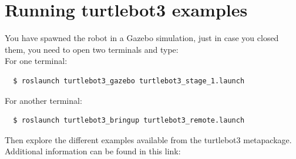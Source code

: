 \documentclass[12pt]{article}
\begin{document}
\section{Running turtlebot3 examples}
You have spawned the robot in a Gazebo simulation, just in case you closed them, you need to open two terminals and type:\\

For one terminal:
\begin{verbatim}
  $ roslaunch turtlebot3_gazebo turtlebot3_stage_1.launch
\end{verbatim}

For another terminal:

\begin{verbatim}
  $ roslaunch turtlebot3_bringup turtlebot3_remote.launch
\end{verbatim}

Then explore the different examples available from the turtlebot3 metapackage. Additional information can be found in this link:

\end{document}
